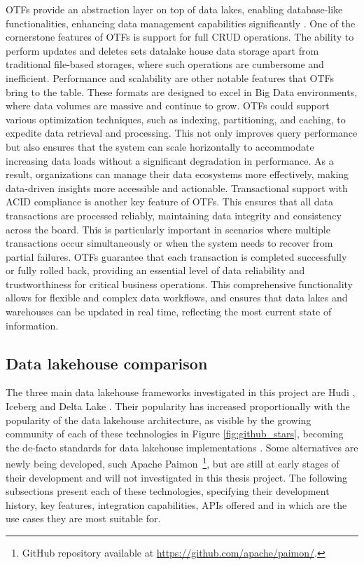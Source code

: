 \glspl{OTF} provide an abstraction layer on top of data lakes, enabling database-like functionalities, enhancing data management capabilities significantly \cite{lakehouse2021,DataLakehouseSurvey2025}. One of the cornerstone features of \glspl{OTF} is support for full \gls{CRUD} operations. The ability to perform updates and deletes sets datalake house data storage apart from traditional file-based storages, where such operations are cumbersome and inefficient. Performance and scalability are other notable features that \glspl{OTF} bring to the table. These formats are designed to excel in Big Data environments, where data volumes are massive and continue to grow. \glspl{OTF} could support various optimization techniques, such as indexing, partitioning, and caching, to expedite data retrieval and processing. This not only improves query performance but also ensures that the system can scale horizontally to accommodate increasing data loads without a significant degradation in performance. As a result, organizations can manage their data ecosystems more effectively, making data-driven insights more accessible and actionable. Transactional support with \gls{ACID} compliance is another key feature of \glspl{OTF}. This ensures that all data transactions are processed reliably, maintaining data integrity and consistency across the board. This is particularly important in scenarios where multiple transactions occur simultaneously or when the system needs to recover from partial failures. \glspl{OTF} guarantee that each transaction is completed successfully or fully rolled back, providing an essential level of data reliability and trustworthiness for critical business operations. This comprehensive functionality allows for flexible and complex data workflows, and ensures that data lakes and warehouses can be updated in real time, reflecting the most current state of information.



\subsection{Data lakehouse comparison}
\label{subsec:datalakehouse_comparison}

The three main data lakehouse frameworks investigated in this project are Hudi \cite{rajaperumalUberEngineeringIncremental2017}, Iceberg \cite{IcebergExamples2024} and Delta Lake \cite{armbrustDeltaLakeHighperformance2020}. Their popularity has increased proportionally with the popularity of the data lakehouse architecture, as visible by the growing community of each of these technologies in Figure \ref{fig:github_stars}, becoming the de-facto standards for data lakehouse implementations \cite{jainAnalyzingComparingLakehouse2023}. Some alternatives are newly being developed, such Apache Paimon~\footnote{GitHub repository available at \url{https://github.com/apache/paimon/}.}, but are still at early stages of their development and will not investigated in this thesis project. The following subsections present each of these technologies, specifying their development history, key features, integration capabilities, \gls{APIs} offered and in which are the use cases they are most suitable for. 

